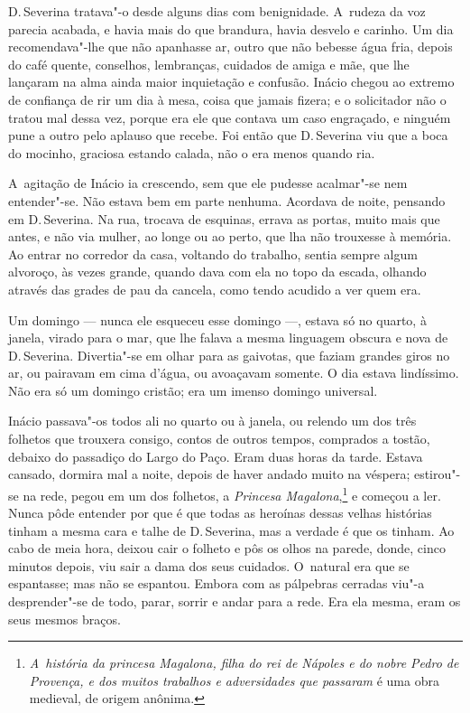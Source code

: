 \begin{linenumbers}
D.\,Severina tratava"-o desde alguns dias com benignidade. A~rudeza da voz
parecia acabada, e havia mais do que brandura, havia desvelo e carinho.
Um dia recomendava"-lhe que não apanhasse ar, outro que não bebesse água
fria, depois do café quente, conselhos, lembranças, cuidados de amiga e
mãe, que lhe lançaram na alma ainda maior inquietação e confusão. Inácio
chegou ao extremo de confiança de rir um dia à mesa, coisa que jamais
fizera; e o solicitador não o tratou mal dessa vez, porque era ele que
contava um caso engraçado, e ninguém pune a outro pelo aplauso que
recebe. Foi então que D.\,Severina viu que a boca do mocinho, graciosa
estando calada, não o era menos quando ria.

A~agitação de Inácio ia crescendo, sem que ele pudesse acalmar"-se nem
entender"-se. Não estava bem em parte nenhuma. Acordava de noite,
pensando em D.\,Severina. Na rua, trocava de esquinas, errava as portas,
muito mais que antes, e não via mulher, ao longe ou ao perto, que lha
não trouxesse à memória. Ao entrar no corredor da casa, voltando do
trabalho, sentia sempre algum alvoroço, às vezes grande, quando dava com
ela no topo da escada, olhando através das grades de pau da cancela,
como tendo acudido a ver quem era.

Um domingo --- nunca ele esqueceu esse domingo ---, estava só no quarto, à
janela, virado para o mar, que lhe falava a mesma linguagem obscura e
nova de D.\,Severina. Divertia"-se em olhar para as gaivotas, que faziam
grandes giros no ar, ou pairavam em cima d'água, ou avoaçavam somente. O
dia estava lindíssimo. Não era só um domingo cristão; era um imenso
domingo universal.

Inácio passava"-os todos ali no quarto ou à janela, ou relendo um dos
três folhetos que trouxera consigo, contos de outros tempos, comprados a
tostão, debaixo do passadiço do Largo do Paço. Eram duas horas da tarde.
Estava cansado, dormira mal a noite, depois de haver andado muito na
véspera; estirou"-se na rede, pegou em um dos folhetos, a \emph{Princesa
Magalona},\footnote{\emph{A~história da princesa Magalona, filha do rei
  de Nápoles e do nobre Pedro de Provença, e dos muitos trabalhos e
  adversidades que passaram} é uma obra medieval, de origem anônima.} e
começou a ler. Nunca pôde entender por que é que todas as heroínas
dessas velhas histórias tinham a mesma cara e talhe de D.\,Severina, mas
a verdade é que os tinham. Ao cabo de meia hora, deixou cair o folheto e
pôs os olhos na parede, donde, cinco minutos depois, viu sair a dama dos
seus cuidados. O~natural era que se espantasse; mas não se espantou.
Embora com as pálpebras cerradas viu"-a desprender"-se de todo, parar,
sorrir e andar para a rede. Era ela mesma, eram os seus mesmos braços.


\end{linenumbers}
